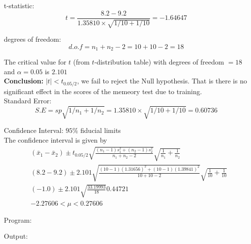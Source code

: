 \documentclass[a4paper,11pt,openright]{report}
\begin{document}
\begin{enumerate}
\vspace{0.5cm}

t-statistic:
\begin{equation*}
t = \frac{8.2 - 9.2}{1.35810 \times \sqrt{1/10 + 1/10}} = -1.64647
\end{equation*}

degrees of freedom:
\begin{equation*}
d.o.f = n_{1} + n_{2} - 2 = 10 + 10 - 2 = 18
\end{equation*}

The critical value for $t$ (from $t$-distribution table) with degrees of freedom $= 18$ and 
$\alpha = 0.05$ is $2.101$ \\

\textbf{Conclusion:} $|t| < t_{0.05/2}$, we fail to reject the Null hypothesis. That is 
there is no significant effect in the scores of the memeory test due to training. \\
 
Standard Error:
\begin{equation*}
S.E = sp \sqrt{1/n_{1} + 1/n_{2}} = 1.35810 \times \sqrt{1/10 + 1/10} = 0.60736
\end{equation*}

Confidence Interval: $95\%$ fiducial limits \\
The confidence interval is given by
\begin{equation*}
\begin{split}
&(\bar x_{1} - \bar x_{2}) \pm t_{0.05/2} \sqrt{\frac{(n_{1} - 1)s_{1}^{2} + (n_{2} - 1)s_{2}^{2}}{n_{1} + n_{2} -2}} \sqrt{\frac{1}{n_{1}} + \frac{1}{n_{2}}} \\
&(8.2 - 9.2) \pm 2.101 \sqrt{\frac{(10 - 1)(1.31656)^{2} + (10 - 1)(1.39841)^{2}}{10 + 10 - 2}} \sqrt{\frac{1}{10} + \frac{1}{10}} \\
&(-1.0) \pm 2.101 \sqrt{\frac{33.19993}{18}} 0.44721 \\
&-2.27606 < \mu < 0.27606
\end{split}
\end{equation*}

\vspace{1cm}

Program:


\vspace{0.5cm}

Output:



\end{enumerate}
\end{document}
